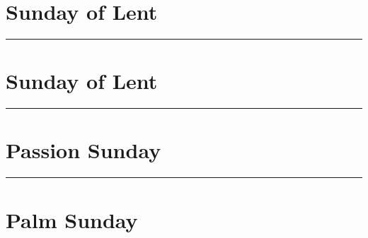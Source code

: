 {{{\bigskip
\benedicamusdomino{}
}

{
\section{ Sunday of Lent}
\label{lent3}
\printcommonvespers[1]

\def\commemorations{If today is March 18 or 19, First Vespers of St Joseph is commemorated as on page \pageref{stjoseph-commem}.  If today is March 24 or 25, First Vespers of the Annunciation is commemorated as follows.}
\printcommemnote{}
}

\medskip
\hrule
{
\label{annunciation-commem}
\def\begincollectcols{\begin{parcolumns}[rulebetween,colwidths={1=0.43\linewidth}]{2}}


\bigskip

\benedicamusdominolentoreaster{}
}

\def\commemorations{If today is March 18 or 19, First Vespers of St Joseph is commemorated as on page \pageref{stjoseph-commem}.  If today is March 24 or 25, First Vespers of the Annunciation is commemorated as on page \pageref{annunciation-commem}.}
{
\section{ Sunday of Lent}
\label{lent4}
\def\liturgicalcolor{Violet or Rose}
\printcommonvespers[1]

\printcommemnote{}
}

\medskip
\hrule
{
\let\printhymnnote=\undefined
\section{Passion Sunday}
\label{lent5}\label{passionsunday}
\printcommonvespers[1]
\def\hymnlabel{hymn-vexillaregis}
\def\vrlabel{vr-eripeme}
\def\hymninput{\gabcfolder/inc-hymn-VexillaRegis}
\def\premagnificat{\pagebreak}
\def\precollect{\vspace{-1.5\baselineskip}}

\printcommemnote{}
}

\medskip
\hrule
{
\section{Palm Sunday}
\label{lent6}\label{palmsunday}
\printcommonvespers[1]
\renewcommand{\printhymnnote}{
	\noindent\printnote{Hymn.~\emph{Vexílla Regis}, page \pageref{hymn-vexillaregis}.
	\Vbar~\emph{Eripe me, Dómine}, page \pageref{vr-eripeme}.}
}

\bigskip
\benedicamusdomino{}
}

}
}